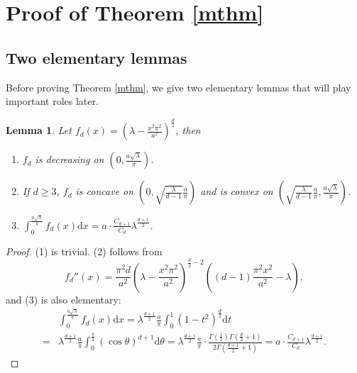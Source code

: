 \documentclass[11pt,letterpaper]{amsart}
\numberwithin{equation}{section}
\theoremstyle{plain}
\newtheorem{lemma}[theorem]{Lemma}
\theoremstyle{plain}
\numberwithin{equation}{section}
\theoremstyle{remark}
\begin{document}
	
	\section{Proof of Theorem \ref{mthm}}\label{pfmthm}
	
	\subsection{Two elementary lemmas}
	Before proving Theorem \ref{mthm}, we give two elementary lemmas that will play  important roles later. 
	
	\begin{lemma}\label{prioffun}
		Let $f_d(x)=(\lambda-\frac{x^2 \pi^2}{a^2})^{\frac{d}{2}}$, then
		\begin{enumerate}[$\mathrm{(1)}$]
			\item[$\mathrm{(1)}$] $f_d$ is decreasing on $(0,\frac{a \sqrt \lambda}{\pi})$.
			\item[$\mathrm{(2)}$] If $d\ge 3$, $f_d$ is concave on $(0, \sqrt{\frac{\lambda}{d-1}}\frac{a}{\pi})$ and is convex on $(\sqrt{\frac{\lambda}{d-1}}\frac{a}{\pi}, \frac{a \sqrt \lambda}{\pi})$.
			\item[$\mathrm{(3)}$] $\int_0^{\frac{a \sqrt \lambda}{\pi}} f_d(x) \mathrm{d}x= a\cdot\frac{C_{d+1}}{C_d}\lambda^{\frac{d+1}{2}}$.
		\end{enumerate}
	\end{lemma}
	
	\begin{proof}
		(1) is trivial. (2) follows from 
		\[
		f_d''(x)= \frac{\pi^2 d}{a^2}(\lambda-\frac{x^2\pi^2}{a^2})^{\frac{d}{2}-2}((d-1)\frac{\pi^2 x^2}{a^2}-\lambda),
		\]
		and (3) is also elementary: 
		\[
		\begin{aligned}
			&\int_0^{\frac{a \sqrt \lambda}{\pi}} f_d(x) \mathrm{d}x= \lambda^{\frac{d+1}{2}} \frac{a}{\pi} \int_0^1 (1-t^2)^{\frac{d}{2}} \mathrm{d}t\\
			=&\lambda^{\frac{d+1}{2}} \frac{a}{\pi} \int_0^{\frac{\pi}{2}} (\cos\theta)^{d+1} \mathrm{d}\theta= \lambda^{\frac{d+1}{2}} \frac{a}{\pi}\cdot \frac{\Gamma(\frac{1}{2})\Gamma(\frac{d}{2}+1)}{2\Gamma(\frac{d+1}{2}+1)}= a\cdot\frac{C_{d+1}}{C_d}\lambda^{\frac{d+1}{2}}.
		\end{aligned}
		\]
	\end{proof}
	
\end{document}

